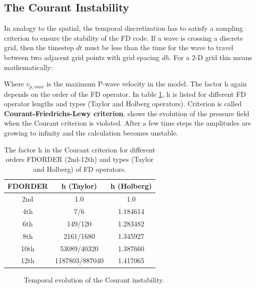 \documentclass[11pt,onecolumn,oneside]{article}
\begin{document}
\clearpage
\subsection{The Courant Instability}\label{courandt}
In analogy to the spatial, the temporal discretization has to satisfy a sampling criterion to ensure the stability of the FD code. If a  wave is crossing a discrete grid, then the timestep $dt$ must be less than the time for the wave to travel between two adjacent grid  points with grid spacing $dh$. For a 2-D grid this means mathematically: 


Where $v_{p,max}$ is the maximum P-wave velocity in the model. The factor h again depends on the order of the FD operator. In table  \ref{courant.1}, h is listed for different FD operator lengths and types (Taylor and Holberg operators). Criterion  is called {\bf{Courant-Friedrichs-Lewy criterion}}.  shows the evolution of the pressure field when the Courant 
criterion is violated. After a few time steps the amplitudes are growing to infinity and the calculation becomes unstable.

\begin{table}[hbt]
\begin{center}
\begin{tabular}{ccc}\hline \hline
FDORDER & h (Taylor)      & h (Holberg) \\ \hline 
2nd   &   1.0             &  1.0        \\
4th   &   7/6             &  1.184614   \\
6th   &   149/120         &  1.283482   \\
8th   &   2161/1680       &  1.345927   \\
10th  &   53089/40320     &  1.387660   \\
12th  &   1187803/887040  &  1.417065   \\   
\hline \hline
\end{tabular}
\caption{\label{courant.1} The factor h in the Courant criterion for different orders FDORDER (2nd-12th) and types (Taylor and Holberg) of FD operators.}
\end{center}
\end{table} 



\begin{figure}[ht]
\begin{center}
\caption{\label{courandt_pics} Temporal evolution of the Courant instability.}
\end{center}
\end{figure}
\clearpage
\end{document}
